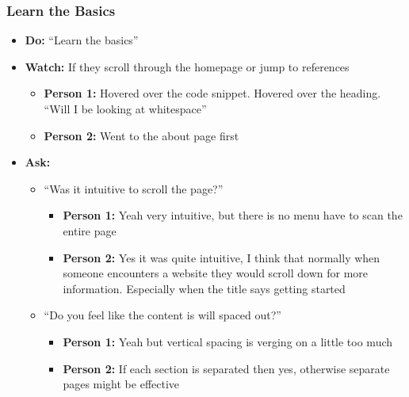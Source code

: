 \subsubsection{Learn the Basics}
\begin{itemize}
	\item\textbf{Do:} ``Learn the basics''
	\item\textbf{Watch:} If they scroll through the homepage or jump to references
	\begin{itemize}
		\item\textbf{Person 1:} Hovered over the code snippet. Hovered over the heading. ``Will I be looking at whitespace''
		\item\textbf{Person 2:} Went to the about page first
	\end{itemize}
	\item\textbf{Ask:}
	\begin{itemize}
		\item ``Was it intuitive to scroll	the page?''
		\begin{itemize}
			\item\textbf{Person 1:} Yeah very intuitive, but there is no menu have to scan the entire page
			\item\textbf{Person 2:} Yes it was quite intuitive, I think that normally when someone encounters a website they would scroll down for more information. Especially when the title says getting started
		\end{itemize}
		\item ``Do you feel like the content is will spaced out?''
		\begin{itemize}
			\item\textbf{Person 1:} Yeah but vertical spacing is verging on a little too much
			\item\textbf{Person 2:} If each section is separated then yes, otherwise separate pages might be effective
		\end{itemize}
	\end{itemize}
\end{itemize}


